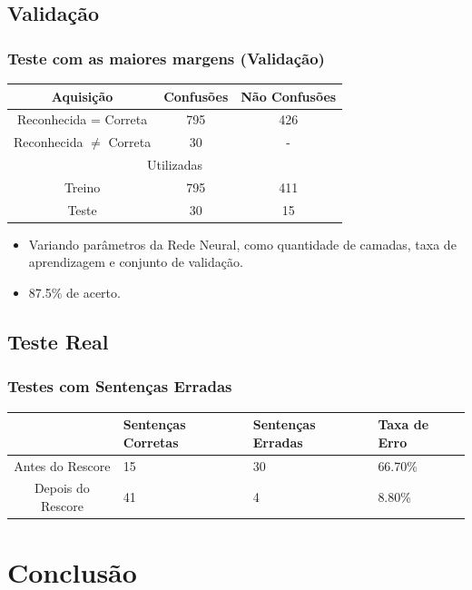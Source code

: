 \documentclass{beamer}
\begin{document}
      \subsection{Validação}
      \begin{frame}
	\frametitle{Teste com as maiores margens (Validação)}
	\begin{table}
	  \centering
	  \begin{tabular}{c  c  c}
	    \toprule
	    Aquisição & Confusões & Não Confusões \\\midrule
	    Reconhecida = Correta & 795 & 426 \\
	    Reconhecida $\neq$ Correta & 30&  - \\\midrule
	    \multicolumn{3}{c}{Utilizadas}  \\\midrule
	    Treino & 795 & 411 \\
	    Teste & 30 & 15 \\\bottomrule
	  \end{tabular}
	\end{table}
	\pause
	\begin{itemize}
	  \item Variando parâmetros da Rede Neural, como quantidade de camadas, taxa de aprendizagem e conjunto de validação.
	  \item 87.5\% de acerto.
	\end{itemize}
      \end{frame}

      \subsection{Teste Real}
      \begin{frame}
	\frametitle{Testes com Sentenças Erradas}
	\begin{table}[!h]
	  \centering
	  \small
	  \begin{tabular}{c p{0.8in} p{0.8in} p{0.8in}}
	    \toprule
	    & Sentenças Corretas & Sentenças Erradas & Taxa de Erro \\\midrule
	    Antes do Rescore & 15 & 30 & 66.70\% \\
	    Depois do Rescore & 41  & 4 & 8.80\% \\
	    \bottomrule
	  \end{tabular}
	\end{table}
      \end{frame}

      \section{Conclusão}
\end{document}
